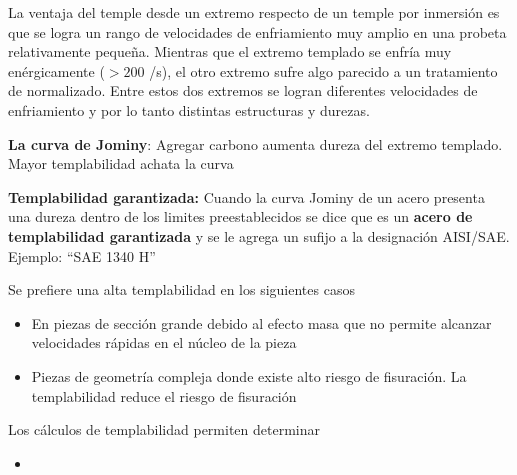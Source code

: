 La ventaja del temple desde un extremo respecto de un temple por inmersión es que se logra un rango de velocidades de enfriamiento muy amplio en una probeta relativamente pequeña. Mientras que el extremo templado se enfría muy enérgicamente ($>200$ \grad/s), el otro extremo sufre algo parecido a un tratamiento de normalizado. Entre estos dos extremos se logran diferentes velocidades de enfriamiento y por lo tanto distintas estructuras y durezas.

\textbf{La curva de Jominy}: Agregar carbono aumenta dureza del extremo templado. Mayor templabilidad achata la curva

\textbf{Templabilidad garantizada:} Cuando la curva Jominy de un acero presenta una dureza dentro de los limites preestablecidos se dice que es un \textbf{acero de templabilidad garantizada} y se le agrega un sufijo a la designación AISI/SAE. Ejemplo: ``SAE 1340 H'' 


Se prefiere una alta templabilidad en los siguientes casos
\begin{itemize}
    \item En piezas de sección grande debido al efecto masa que no permite alcanzar velocidades rápidas en el núcleo de la pieza
    \item Piezas de geometría compleja donde existe alto riesgo de fisuraci\'on. La templabilidad reduce el riesgo de fisuración
\end{itemize}

Los cálculos de templabilidad permiten determinar 

\begin{itemize}
    \item 
\end{itemize}



